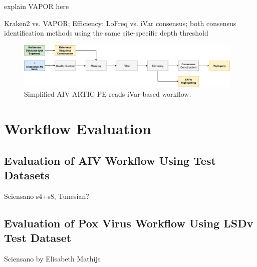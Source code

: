 explain VAPOR here

Kraken2 vs. VAPOR;
Efficiency: LoFreq vs. iVar consensus; both consensus identification methods using the same site-specific depth threshold

\begin{figure}
	\centering
	\includegraphics[width=0.97\textwidth]{media/workflow-diagrams/pipelines-AIV.pdf}
	\caption{Simplified AIV ARTIC PE reads iVar-based workflow.}
	\label{fig:wf-aiv}
\end{figure}

\section{Workflow Evaluation}
\subsection{Evaluation of AIV Workflow Using Test Datasets}
 Sciensano s4+s8, Tunesian?

\subsection{Evaluation of Pox Virus Workflow Using LSDv Test Dataset}
 Sciensano by Elisabeth Mathijs
